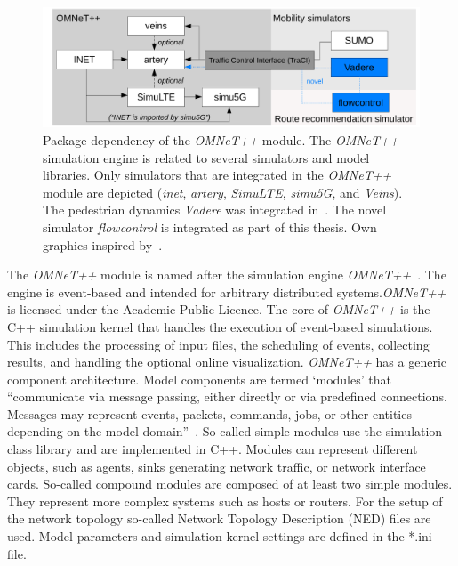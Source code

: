 \begin{figure}[hbt!]
\centering
\includegraphics[width=\textwidth]{../figures/crownet/frameworkdependencies.pdf}
\caption{Package dependency of the \textit{OMNeT++} module. The \textit{OMNeT++} simulation engine is related to several simulators and model libraries. Only simulators that are integrated in the \textit{OMNeT++} module are depicted (\textit{inet}, \textit{artery}, \textit{SimuLTE}, \textit{simu5G}, and \textit{Veins}).
The pedestrian dynamics \textit{Vadere} was integrated in~\cite{schuhbaeck-2019-com}. The novel simulator \textit{flowcontrol} is integrated as part of this thesis. Own graphics inspired by~\cite[p.369]{virdis-2019-com}. }
\label{fig:packagedeps}
\end{figure}

The \textit{OMNeT++} module is named after the simulation engine \textit{OMNeT++}~\cite{varga-2019-com}. The engine is event-based and intended for arbitrary distributed systems.\textit{OMNeT++} is licensed under the Academic Public Licence. The core of \textit{OMNeT++} is the C++ simulation kernel that handles the execution of event-based simulations. This includes the processing of input files, the scheduling of events, collecting results, and handling the optional online visualization. \textit{OMNeT++} has a generic component architecture. Model components are termed `modules' that \enquote{communicate via message passing, either
directly or via predefined connections. Messages may represent events, packets, commands, jobs, or other entities depending on the model domain}~\cite{varga-2019-com}. So-called simple modules use the simulation class library and are implemented in C++. Modules can represent different objects, such as agents, sinks generating network traffic, or network interface cards.  So-called compound modules  are composed of at least two simple modules. They represent more complex systems such as hosts or routers. For the setup of the network topology so-called Network Topology Description (NED) files are used. Model parameters and simulation kernel settings are defined in the *.ini file.
 


